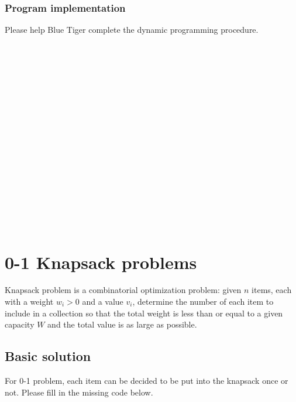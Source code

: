 \documentclass[11pt]{exam}
\begin{document}
\subsubsection{Program implementation}
Please help Blue Tiger complete the dynamic programming procedure.
\begin{solution}
    \\ \hspace*{\fill} \\
    \\ \hspace*{\fill} \\
    \\ \hspace*{\fill} \\
    \\ \hspace*{\fill} \\
    \\ \hspace*{\fill} \\
    \\ \hspace*{\fill} \\
    \\ \hspace*{\fill} \\
    \\ \hspace*{\fill} \\
\end{solution}

\section{0-1 Knapsack problems}
Knapsack problem is a combinatorial optimization problem: given $n$ items,
each with a weight $w_i > 0$ and a value $v_i$, determine the number
of each item to include in a collection so that the total weight is less than or
equal to a given capacity $W$ and the total value is as large as possible.

\subsection{Basic solution}

For 0-1 problem, each item can be decided to be put into the knapsack once or not.
Please fill in the missing code below.
\end{document}
